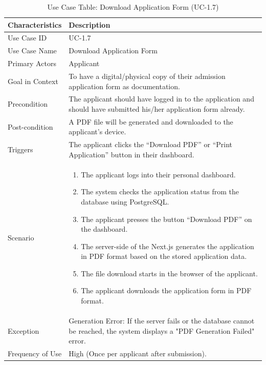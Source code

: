 \begin{table}[H] %
    \centering
    \small
    \renewcommand{\arraystretch}{1.4}
    \caption{Use Case Table: Download Application Form (UC-1.7)}
    \label{tab:use_case_download_form}
    
    \begin{tabularx}{\textwidth}{|l|X|}
        \hline
        \rowcolor[gray]{0.9} {Characteristics} & {Description} \\ \hline
        Use Case ID & UC-1.7 \\ \hline
        Use Case Name & Download Application Form \\ \hline
        Primary Actors & Applicant \\ \hline
        Goal in Context & To have a digital/physical copy of their admission application form as documentation. \\ \hline
        Precondition & The applicant should have logged in to the application and should have submitted his/her application form already. \\ \hline
        Post-condition & A PDF file will be generated and downloaded to the applicant’s device. \\ \hline
        Triggers & The applicant clicks the “Download PDF” or “Print Application” button in their dashboard. \\ \hline
        Scenario & 
        \begin{enumerate}[nosep, leftmargin=*]
            \item The applicant logs into their personal dashboard.
            \item The system checks the application status from the database using PostgreSQL.
            \item The applicant presses the button “Download PDF” on the dashboard.
            \item The server-side of the Next.js generates the application in PDF format based on the stored application data.
            \item The file download starts in the browser of the applicant.
            \item The applicant downloads the application form in PDF format.
        \end{enumerate} \\ \hline
        Exception & {Generation Error:} If the server fails or the database cannot be reached, the system displays a "PDF Generation Failed" error. \\ \hline
        Frequency of Use & High (Once per applicant after submission). \\ \hline
    \end{tabularx}
\end{table}